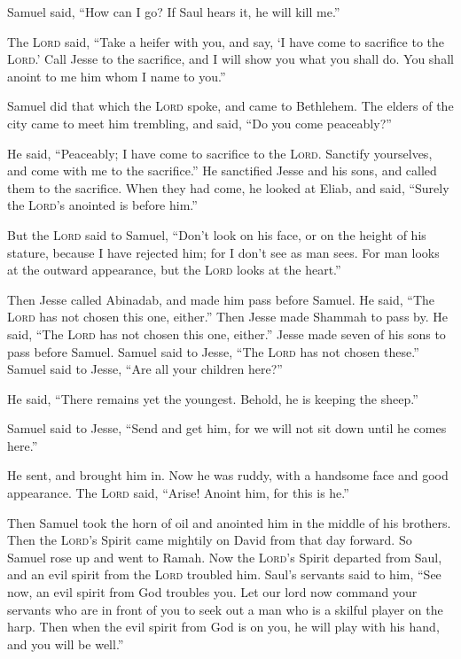  Samuel said, ``How can I go? If Saul hears it, he will
kill me.''

The \textsc{Lord} said, ``Take a heifer with you, and say, `I have come
to sacrifice to the \textsc{Lord}.'  Call Jesse to the
sacrifice, and I will show you what you shall do. You shall anoint to me
him whom I name to you.''

 Samuel did that which the \textsc{Lord} spoke, and came
to Bethlehem. The elders of the city came to meet him trembling, and
said, ``Do you come peaceably?''

 He said, ``Peaceably; I have come to sacrifice to the
\textsc{Lord}. Sanctify yourselves, and come with me to the sacrifice.''
He sanctified Jesse and his sons, and called them to the sacrifice.
 When they had come, he looked at Eliab, and said,
``Surely the \textsc{Lord}'s anointed is before him.''

 But the \textsc{Lord} said to Samuel, ``Don't look on his
face, or on the height of his stature, because I have rejected him; for
I don't see as man sees. For man looks at the outward appearance, but
the \textsc{Lord} looks at the heart.''

 Then Jesse called Abinadab, and made him pass before
Samuel. He said, ``The \textsc{Lord} has not chosen this one, either.''
 Then Jesse made Shammah to pass by. He said, ``The
\textsc{Lord} has not chosen this one, either.''  Jesse
made seven of his sons to pass before Samuel. Samuel said to Jesse,
``The \textsc{Lord} has not chosen these.''  Samuel said
to Jesse, ``Are all your children here?''

He said, ``There remains yet the youngest. Behold, he is keeping the
sheep.''

Samuel said to Jesse, ``Send and get him, for we will not sit down until
he comes here.''

 He sent, and brought him in. Now he was ruddy, with a
handsome face and good appearance. The \textsc{Lord} said, ``Arise!
Anoint him, for this is he.''

 Then Samuel took the horn of oil and anointed him in the
middle of his brothers. Then the \textsc{Lord}'s Spirit came mightily on
David from that day forward. So Samuel rose up and went to Ramah.
 Now the \textsc{Lord}'s Spirit departed from Saul, and
an evil spirit from the \textsc{Lord} troubled him. 
Saul's servants said to him, ``See now, an evil spirit from God troubles
you.  Let our lord now command your servants who are in
front of you to seek out a man who is a skilful player on the harp. Then
when the evil spirit from God is on you, he will play with his hand, and
you will be well.''

